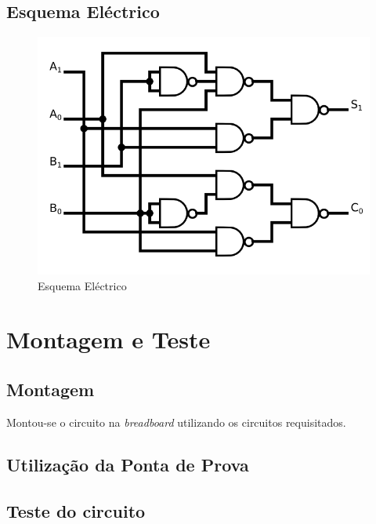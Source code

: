 \documentclass[a4paper,12pt]{article}
\begin{document}
\subsection{Esquema Eléctrico}


\begin{figure}[h]
\caption{Esquema Eléctrico}
\begin{center}
\includegraphics[scale=0.45]{SD_logi.png}
\end{center}
\end{figure}

\section{Montagem e Teste}
\subsection{Montagem}
Montou-se o circuito na {\it breadboard} utilizando os circuitos requisitados.
\subsection{Utilização da Ponta de Prova}
\vspace*{10\baselineskip}
\subsection{Teste do circuito}
\end{document}
